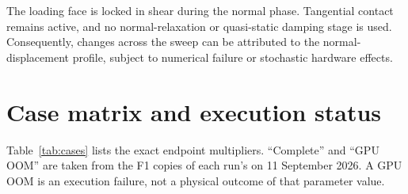 \documentclass[11pt]{article}
\newcommand{\file}[1]{\path{#1}}
\begin{document}
The loading face is locked in shear during the normal phase.  Tangential
contact remains active, and no normal-relaxation or quasi-static damping stage
is used.  Consequently, changes across the sweep can be attributed to the
normal-displacement profile, subject to numerical failure or stochastic
hardware effects.

\section{Case matrix and execution status}

Table~\ref{tab:cases} lists the exact endpoint multipliers.  ``Complete'' and
``GPU OOM'' are taken from the F1 copies of each run's \file{status.json} on
11 September 2026.  A GPU OOM is an execution failure, not a physical outcome
of that parameter value.
\end{document}
